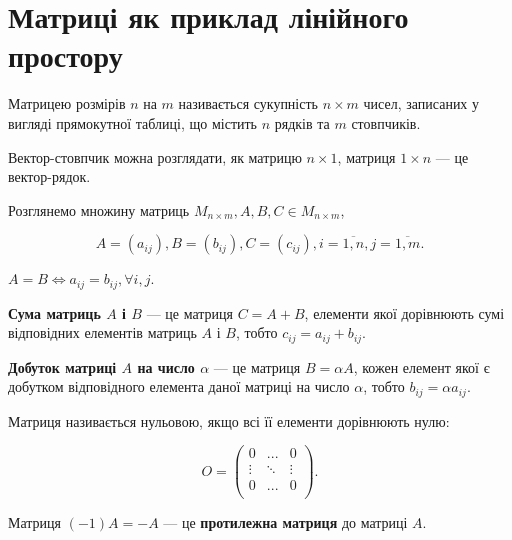 \section{Матриці як приклад лінійного простору}

\begin{definition}
	Матрицею розмірів $n$ на $m$ називається сукупність $n \times m$ чисел,
	записаних у вигляді прямокутної таблиці, що містить $n$ рядків та $m$ стовпчиків.
\end{definition}

Вектор-стовпчик можна розглядати, як матрицю $n \times 1$, матриця $1 \times n$ --- це
вектор-рядок.

Розглянемо множину матриць $M_{n \times m}, A, B, C \in M_{n \times m}$,

$$A = (a_{ij}), B = (b_{ij}), C = (c_{ij}), i = \overline{1,n},j = \overline{1,m}.$$

\begin{definition}
	$A = B \Leftrightarrow a_{ij} = b_{ij}, \forall i, j$.
\end{definition}

\begin{definition}
	\textbf{Сума матриць $A$ і $B$} --- це матриця $C = A + B$, елементи
	якої дорівнюють сумі відповідних елементів матриць $A$ і $B$, тобто $c_{ij} = a_{ij} + b_{ij}$.
\end{definition}

\begin{definition}
	\textbf{Добуток матриці $A$ на число $\alpha$} --- це матриця $B = \alpha A$, кожен
	елемент якої є добутком відповідного елемента даної матриці на число $\alpha$, тобто
	$b_{ij} = \alpha a_{ij}$.
\end{definition}

\begin{definition}
	Матриця називається нульовою, якщо всі її елементи дорівнюють нулю:

	$$O = \begin{pmatrix}
		0 & ... & 0  \\
		\vdots & \ddots & \vdots  \\
		0 & ... & 0  \\
	\end{pmatrix}.$$
\end{definition}

\begin{definition}
	Матриця $(-1)A = -A$ --- це \textbf{протилежна матриця} до матриці $A$.
\end{definition}

